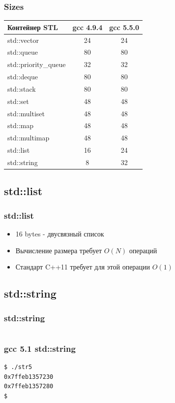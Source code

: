 \documentclass{beamer}
\begin{document}
\begin{frame}[fragile]
\frametitle{Sizes}
\begin{longtable}{|l|c|c|}
\hline
Контейнер STL & gcc 4.9.4 & gcc 5.5.0 \\
\hline
std::vector & 24 & 24 \\
std::queue & 80 & 80 \\
std::priority\_queue & 32 & 32 \\
std::deque & 80 & 80 \\
std::stack & 80 & 80 \\
std::set & 48 & 48 \\
std::multiset & 48 & 48 \\
std::map & 48 & 48 \\
std::multimap & 48 & 48 \\
std::list & 16 & 24 \\
std::string & 8 & 32 \\
\hline
\end{longtable}
\end{frame}

\subsection*{std::list}

\begin{frame}[fragile]
\frametitle{std::list}
\begin{itemize}
\item 16 bytes - двусвязный список
\item Вычисление размера требует $O(N)$ операций
\item Стандарт C++11 требует для этой операции $O(1)$
\end{itemize}
\end{frame}

\subsection*{std::string}

\begin{frame}[fragile]
\frametitle{std::string}
\inputminted{c++}{../src/str.cpp}
\end{frame}

\begin{frame}[fragile]
\frametitle{gcc 5.1 std::string}
\begin{verbatim}
$ ./str5
0x7ffeb1357230
0x7ffeb1357280
$
\end{verbatim}
\end{frame}
\end{document}
